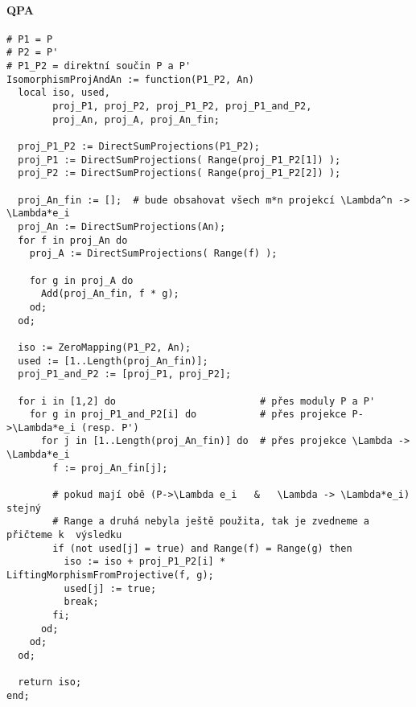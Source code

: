 \documentclass[7pt]{article}
\begin{document}
     \paragraph{QPA} 
       \begin{verbatim}
# P1 = P
# P2 = P'
# P1_P2 = direktní součin P a P'
IsomorphismProjAndAn := function(P1_P2, An)
  local iso, used,
        proj_P1, proj_P2, proj_P1_P2, proj_P1_and_P2,
        proj_An, proj_A, proj_An_fin;

  proj_P1_P2 := DirectSumProjections(P1_P2);
  proj_P1 := DirectSumProjections( Range(proj_P1_P2[1]) );
  proj_P2 := DirectSumProjections( Range(proj_P1_P2[2]) );

  proj_An_fin := [];  # bude obsahovat všech m*n projekcí \Lambda^n -> \Lambda*e_i
  proj_An := DirectSumProjections(An);
  for f in proj_An do
    proj_A := DirectSumProjections( Range(f) );

    for g in proj_A do
      Add(proj_An_fin, f * g);
    od;
  od;

  iso := ZeroMapping(P1_P2, An);
  used := [1..Length(proj_An_fin)];
  proj_P1_and_P2 := [proj_P1, proj_P2];

  for i in [1,2] do                         # přes moduly P a P'
    for g in proj_P1_and_P2[i] do           # přes projekce P->\Lambda*e_i (resp. P')
      for j in [1..Length(proj_An_fin)] do  # přes projekce \Lambda -> \Lambda*e_i
        f := proj_An_fin[j];

        # pokud mají obě (P->\Lambda e_i   &   \Lambda -> \Lambda*e_i) stejný 
        # Range a druhá nebyla ještě použita, tak je zvedneme a přičteme k  výsledku
        if (not used[j] = true) and Range(f) = Range(g) then
          iso := iso + proj_P1_P2[i] * LiftingMorphismFromProjective(f, g);
          used[j] := true;
          break;
        fi;
      od;
    od;
  od;

  return iso;
end;      
       \end{verbatim}
\end{document}
